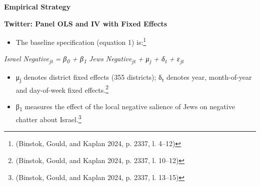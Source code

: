 \par\textbf{Empirical Strategy}\par

\par\textbf{Twitter: Panel OLS and IV with Fixed Effects}\par

\begin{itemize}
\item
  The baseline specification (equation 1) is:\footnote{(Binstok, Gould, and Kaplan 2024, p. 2337, l. 4--12)}
\end{itemize}

\emph{Israel Negative\textsubscript{jt} = β\textsubscript{0} + β\textsubscript{1} Jews Negative\textsubscript{jt} + μ\textsubscript{j} + δ\textsubscript{t} + ε\textsubscript{jt}}

\begin{itemize}
\item
  μ\textsubscript{j} denotes district fixed effects (355 districts); δ\textsubscript{t} denotes year, month-of-year and day-of-week fixed effects.\footnote{(Binstok, Gould, and Kaplan 2024, p. 2337, l. 10--12)}
\item
  β\textsubscript{1} measures the effect of the local negative salience of Jews on negative chatter about Israel.\footnote{(Binstok, Gould, and Kaplan 2024, p. 2337, l. 13--15)}
\end{itemize}

